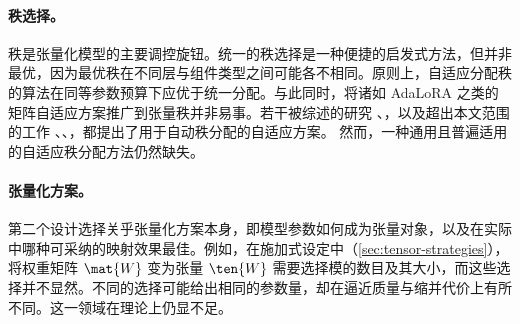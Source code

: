 \paragraph{秩选择。}

秩是张量化模型的主要调控旋钮。统一的秩选择是一种便捷的启发式方法，但并非最优，因为最优秩在不同层与组件类型之间可能各不相同。原则上，自适应分配秩的算法在同等参数预算下应优于统一分配。与此同时，将诸如 AdaLoRA \cite{zhang2023adalora} 之类的矩阵自适应方案推广到张量秩并非易事。若干被综述的研究 \cite{yang2024comera}、\cite{lopezpiqueres2025metatt}，以及超出本文范围的工作 \cite{hawkins2019rankselection1}、\cite{hawkins2021rankselection2}、\cite{gu2022heat}，都提出了用于自动秩分配的自适应方案。
然而，一种通用且普遍适用的自适应秩分配方法仍然缺失。


\paragraph{张量化方案。}

第二个设计选择关乎张量化方案本身，即模型参数如何成为张量对象，以及在实际中哪种可采纳的映射效果最佳。例如，在施加式设定中（\cref{sec:tensor-strategies}），将权重矩阵 $\mat{W}$ 变为张量 $\ten{W}$ 需要选择模的数目及其大小，而这些选择并不显然。不同的选择可能给出相同的参数量，却在逼近质量与缩并代价上有所不同。这一领域在理论上仍显不足。

